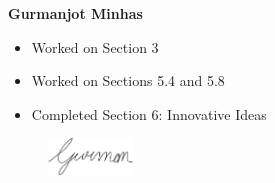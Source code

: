 \textbf{Gurmanjot Minhas}
\begin{itemize}
    \item Worked on Section 3
    \item Worked on Sections 5.4 and 5.8
    \item Completed Section 6: Innovative Ideas
\end{itemize}
\begin{figure}[H]
	\centering
	\includegraphics[width=0.2\textwidth]{Signatures/g.png}
\end{figure}

